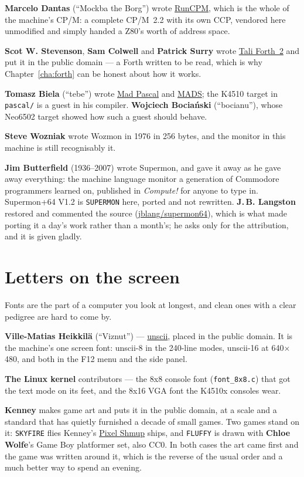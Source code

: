 \textbf{Marcelo Dantas} (``Mockba the Borg'') wrote
\href{https://github.com/MockbaTheBorg/RunCPM}{RunCPM}, which is the
whole of the machine's CP/M: a complete CP/M~2.2 with its own CCP,
vendored here unmodified and simply handed a Z80's worth of address
space.

\textbf{Scot W. Stevenson}, \textbf{Sam Colwell} and \textbf{Patrick
Surry} wrote \href{https://github.com/SamCoVT/TaliForth2}{Tali
Forth~2} and put it in the public domain --- a Forth written to be
read, which is why Chapter~\ref{cha:forth} can be honest about how it
works.

\textbf{Tomasz Biela} (``tebe'') wrote
\href{https://github.com/tebe6502/Mad-Pascal}{Mad Pascal} and
\href{https://github.com/tebe6502/Mad-Assembler}{MADS}; the K4510
target in \verb|pascal/| is a guest in his compiler.
\textbf{Wojciech Bociański} (``bocianu''), whose Neo6502 target showed
how such a guest should behave.

\textbf{Steve Wozniak} wrote Wozmon in 1976 in 256 bytes, and the
monitor in this machine is still recognisably it.

\textbf{Jim Butterfield} (1936--2007) wrote Supermon, and gave it away
as he gave away everything: the machine language monitor a generation of
Commodore programmers learned on, published in \emph{Compute!} for
anyone to type in. Supermon+64 V1.2 is \verb|SUPERMON| here, ported and
not rewritten. \textbf{J.\,B. Langston} restored and commented the
source (\href{https://github.com/jblang/supermon64}{jblang/supermon64}),
which is what made porting it a day's work rather than a month's; he asks
only for the attribution, and it is given gladly.

\section{Letters on the screen}
Fonts are the part of a computer you look at longest, and clean ones
with a clear pedigree are hard to come by.

\textbf{Ville-Matias Heikkilä} (``Viznut'') ---
\href{https://viznut.fi/unscii/}{unscii}, placed in the public domain.
It is the machine's one screen font: unscii-8 in the 240-line modes,
unscii-16 at 640$\times$480, and both in the F12 menu and the side panel.

\textbf{The Linux kernel} contributors --- the 8x8 console font
(\verb|font_8x8.c|) that got the text mode on its feet, and the 8x16 VGA
font the K4510x consoles wear.

\textbf{Kenney} makes game art and puts it in the public domain, at a
scale and a standard that has quietly furnished a decade of small games.
Two games stand on it: \verb|SKYFIRE| flies Kenney's
\href{https://kenney.nl/assets/pixel-shmup}{Pixel Shmup} ships, and
\verb|FLUFFY| is drawn with \textbf{Chloe Wolfe}'s Game Boy platformer
set, also CC0. In both cases the art came first and the game was written
around it, which is the reverse of the usual order and a much better way
to spend an evening.

